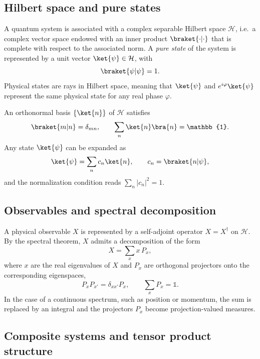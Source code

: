 \subsection{Hilbert space and pure states}

A quantum system is associated with a complex separable Hilbert space $\mathcal{H}$, i.e.\ a complex vector space endowed with an inner product $\braket{\cdot|\cdot}$ that is complete with respect to the associated norm. 
A \emph{pure state} of the system is represented by a unit vector $\ket{\psi} \in \mathcal{H}$, with
\begin{equation}
	\braket{\psi|\psi} = 1.
\end{equation}
Physical states are rays in Hilbert space, meaning that $\ket{\psi}$ and $e^{i\varphi}\ket{\psi}$ represent the same physical state for any real phase $\varphi$.

An orthonormal basis $\{\ket{n}\}$ of $\mathcal{H}$ satisfies
\begin{equation}
	\braket{m|n} = \delta_{mn},
	\qquad
	\sum_n \ket{n}\bra{n} = \mathbb{1}.
\end{equation}
Any state $\ket{\psi}$ can be expanded as
\begin{equation}
	\ket{\psi} = \sum_n c_n \ket{n},
	\qquad
	c_n = \braket{n|\psi},
\end{equation}
and the normalization condition reads $\sum_n |c_n|^2 = 1$.

\subsection{Observables and spectral decomposition}

A physical observable $X$ is represented by a self-adjoint operator $X = X^\dagger$ on $\mathcal{H}$. 
By the spectral theorem, $X$ admits a decomposition of the form
\begin{equation}
	X = \sum_x x \, P_x,
\end{equation}
where $x$ are the real eigenvalues of $X$ and $P_x$ are orthogonal projectors onto the corresponding eigenspaces,
\begin{equation}
	P_x P_{x'} = \delta_{xx'} P_x,
	\qquad
	\sum_x P_x = \mathbb{1}.
\end{equation}
In the case of a continuous spectrum, such as position or momentum, the sum is replaced by an integral and the projectors $P_x$ become projection-valued measures.

\subsection{Composite systems and tensor product structure}


